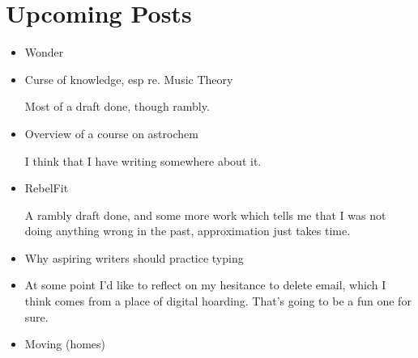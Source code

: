 
\section{Upcoming Posts}  
\begin{itemize}
	\item Wonder  
	\item Curse of knowledge, esp re. Music Theory %

Most of a draft done, though rambly.  
	\item Overview of a course on astrochem

I think that I have writing somewhere about it.  
	\item RebelFit

A rambly draft done, and some more work which tells me that I was not doing anything wrong in the past, approximation just takes time.  
	\item Why aspiring writers should practice typing %

	\item At some point I'd like to reflect on my hesitance to delete email, which I think comes from a place of digital hoarding. That's going to be a fun one for sure.
	\item Moving (homes)


\end{itemize}
